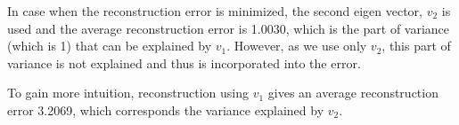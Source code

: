 \documentclass[paper=a4, fontsize=11pt]{scrartcl} %
\numberwithin{equation}{section} %
\numberwithin{figure}{section} %
\numberwithin{table}{section} %
\begin{document}
In case when the reconstruction error is minimized, the second eigen vector, $v_2$ is used and the average reconstruction error is 1.0030, which is the part of variance (which is 1) that can be explained by $v_1$. However, as we use only $v_2$, this part of variance is not explained and thus is incorporated into the error.

To gain more intuition, reconstruction using $v_1$ gives an average reconstruction error 3.2069, which corresponds the variance explained by $v_2$.
\end{document}
